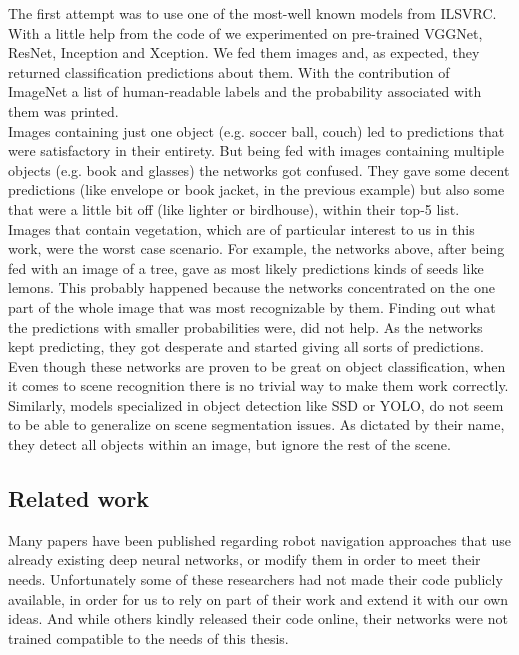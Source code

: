 \documentclass[12pt,a4paper,table,dvipsnames,tikz]{report}
\newcommand{\acronym}{\MakeUppercase}
\begin{document}
	The first attempt was to use one of the most-well known models from \acronym{ilsvrc}. 
	With a little help from the code of \citet{Rosebrocke} we experimented on 
	pre-trained VGGNet, ResNet, Inception and Xception. We fed them images and, 
	as expected, they returned classification predictions about them. With the 
	contribution of ImageNet a list of human-readable labels and the probability 
	associated with them was printed.
	\\
	
	Images containing just one object (e.g. soccer ball, couch) led to predictions 
	that were satisfactory in their entirety. But being fed with images containing 
	multiple objects (e.g. book and glasses) the networks got confused. They gave 
	some decent predictions (like envelope or book jacket, in the previous example) 
	but also some that were a little bit off (like lighter or birdhouse), within 
	their top-5 list.
	\\
	
	Images that contain vegetation, which are of particular interest to us in this work, 
	were the worst case scenario. For example, the networks above, after being fed with 
	an image of a tree, gave as most likely predictions kinds of seeds like lemons. This 
	probably happened because the networks concentrated on the one part of the whole image 
	that was most recognizable by them. Finding out what the predictions with smaller 
	probabilities were, did not help. As the networks kept predicting, they got desperate 
	and started giving all sorts of predictions. 
	\\
	
	Even though these networks are proven to be great on object classification, when 
	it comes to scene recognition there is no trivial way to make them work correctly.
	\\
	
	Similarly, models specialized in object detection like \acronym{ssd} or \acronym{yolo}, 
	do not seem to be able to generalize on scene segmentation issues. As dictated by their 
	name, they detect all objects within an image, but ignore the rest of the scene.
	\\
	
	
	\subsection{Related work}
	\label{sec:fg:nn:rel}
	
	Many papers have been published regarding robot navigation approaches that use 
	already existing deep neural networks, or modify them in order to meet their needs.
	Unfortunately some of these researchers had not made their code publicly available, 
	in order for us to rely on part of their work and extend it with our own ideas. And 
	while others kindly released their code online, their networks were not trained 
	compatible to the needs of this thesis.
	\\
	
\end{document}
